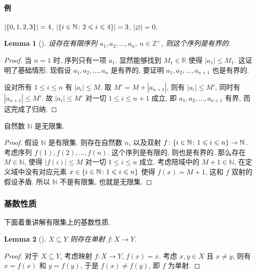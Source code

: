 \documentclass[UTF8]{ctexart}
\theoremstyle{mystyle}
\newtheorem{lemma}{Lemma}[section]
\theoremstyle{myremark}
\theoremstyle{plain}
\newcommand{\R}{\mathbb R}
\newcommand{\Z}{\mathbb Z}
\newcommand{\N}{\mathbb N}
\DeclarePairedDelimiter\set{\{}{\}}
\begin{document}
\paragraph{例}
$ |\set{0, 1, 2, 3}| = 4 $, $ |\set{i \in \N \colon 2 \leqslant i \leqslant 4}| = 3 $, $ |\varnothing| = 0 $.

\begin{lemma}[]
    设存在有限序列 $ a_1, a_2, \dots, a_n $, $ n \in \Z^+ $, 则这个序列是有界的.
\end{lemma}

\begin{proof}
    当 $ n = 1 $ 时, 序列只有一项 $ a_1 $. 显然能够找到 $ M_1 \in \R $ 使得 $ |a_1| \leqslant M_1 $. 这证明了基础情形. 现假设 $ a_1, a_2, \dots, a_n $ 是有界的, 要证明 $ a_1, a_2, \dots, a_{n + 1} $ 也是有界的.

    设对所有 $ 1 \leqslant i \leqslant n $ 有 $ |a_i| \leqslant M $. 取 $ M' = M + |a_{n + 1}| $, 则有 $ |a_i| \leqslant M' $, 同时有 $ |a_{n + 1}| \leqslant M' $. 故 $ |a_i| \leqslant M' $ 对一切 $ 1 \leqslant i \leqslant n+1 $ 成立, 即 $ a_1, a_2, \dots, a_{n + 1} $ 有界, 而这完成了归纳.
\end{proof}


\begin{theorem}
    自然数 $ \N $ 是无限集.
\end{theorem}

\begin{proof}
    假设 $ \N $ 是有限集. 则存在自然数 $ n $, 以及双射 $ f \colon \set{i \in \N \colon 1 \leqslant i \leqslant n} \to \N $. 考虑序列 $ f(1), f(2), \dots, f(n) $. 这个序列是有限的, 则也是有界的. 那么存在 $ M \in \N $, 使得 $ |f(i)| \leqslant M $ 对一切 $ 1 \leqslant i \leqslant n $ 成立. 考虑陪域中的 $ M + 1 \in \N $, 在定义域中没有对应元素 $ x \in \set{i \in \N \colon 1 \leqslant i \leqslant n} $ 使得 $ f(x) = M + 1 $, 这和 $ f $ 双射的假设矛盾. 所以 $ \N $ 不是有限集, 也就是无限集.
\end{proof}

\subsubsection{基数性质}
下面着重讲解有限集上的基数性质.

\begin{lemma}[] \label{subset-injection}
    $ X \subseteq Y $ 则存在单射 $ f \colon X \to Y $.
\end{lemma}

\begin{proof}
    对于 $ X \subseteq Y $, 考虑映射 $ f\colon X \to Y $, $ f(x) = x $. 考虑 $ x, y \in X $ 且 $ x \neq y $, 则有 $ x = f(x) $ 和 $ y = f(y) $, 于是 $ f(x) \neq f(y) $, 即 $ f $ 为单射.
\end{proof}
\end{document}

